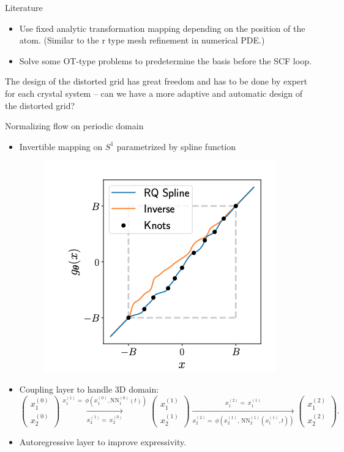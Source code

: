 \documentclass[aspectratio=169]{beamer}
\begin{document}
\begin{frame}{Literature}
	\begin{itemize}
		\item Use fixed analytic transformation mapping depending on the position of the
		atom. (Similar to the r type mesh refinement in numerical PDE.)
		\item Solve some OT-type problems to predetermine the basis before the SCF
		loop.
	\end{itemize}
	
	The design of the distorted grid has great freedom and has to be done by expert 
	for each crystal system -- can we have a more adaptive and automatic design
	of the distorted grid?
\end{frame}


\begin{frame}{Normalizing flow on periodic domain}

	\begin{itemize}
		\item Invertible mapping on $S^1$ parametrized by spline function
		\begin{figure}[h]
			\centering
			\includegraphics[width=.4\linewidth]{fig/nsf.jpg}
		\end{figure}
		\item Coupling layer to handle 3D domain:
		\begin{equation*}\label{equ:cnf-auto-regressive}
			\begin{pmatrix}
			x_1^{(0)} \\
			x_2^{(0)}
			\end{pmatrix} 
			\underset{x_2^{(1)}=\ x_2^{(0)}}{\xrightarrow{x_1^{(1)}=\ \phi(x_1^{(0)}, \text{NN}^{(0)}_1(t))}}
			\begin{pmatrix}
			x_1^{(1)} \\
			x_2^{(1)}
			\end{pmatrix} 
			\underset{x_2^{(2)}=\ \phi(x_2^{(1)},\, \text{NN}^{(1)}_2(x_1^{(1)},t))}{\xrightarrow{\quad\quad x_1^{(2)} =\ x_1^{(1)} \quad\quad }}
			\begin{pmatrix}
			x_1^{(2)} \\
			x_2^{(2)}
			\end{pmatrix}.
		\end{equation*}
		\item Autoregressive layer to improve expressivity.
	\end{itemize}
\end{frame}
\end{document}
